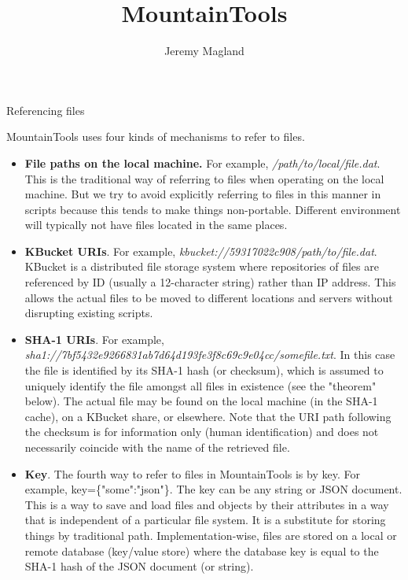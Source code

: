 \documentclass{article}
\title{MountainTools}
\author{Jeremy Magland}
\begin{document}
\maketitle

\begin{section}{Referencing files}

MountainTools uses four kinds of mechanisms to refer to files.

\begin{itemize}
    \item \textbf{File paths on the local machine.} For example, \textit{/path/to/local/file.dat}. This is the traditional way of referring to files when operating on the local machine. But we try to avoid explicitly referring to files in this manner in scripts because this tends to make things non-portable. Different environment will typically not have files located in the same places.
    \item \textbf{KBucket URIs}. For example, \textit{kbucket://59317022c908/path/to/file.dat}. KBucket is a distributed file storage system where repositories of files are referenced by ID (usually a 12-character string) rather than IP address. This allows the actual files to be moved to different locations and servers without disrupting existing scripts.
    \item \textbf{SHA-1 URIs}. For example, \textit{sha1://7bf5432e9266831ab7d64d193fe3f8c69c9e04cc/somefile.txt}. In this case the file is identified by its SHA-1 hash (or checksum), which is assumed to uniquely identify the file amongst all files in existence (see the "theorem" below). The actual file may be found on the local machine (in the SHA-1 cache), on a KBucket share, or elsewhere. Note that the URI path following the checksum is for information only (human identification) and does not necessarily coincide with the name of the retrieved file.
    \item \textbf{Key}. The fourth way to refer to files in MountainTools is by key. For example, key=\{"some":"json"\}. The key can be any string or JSON document. This is a way to save and load files and objects by their attributes in a way that is independent of a particular file system. It is a substitute for storing things by traditional path. Implementation-wise, files are stored on a local or remote database (key/value store) where the database key is equal to the SHA-1 hash of the JSON document (or string).
\end{itemize}

\newpage
 

\end{section}
\end{document}
